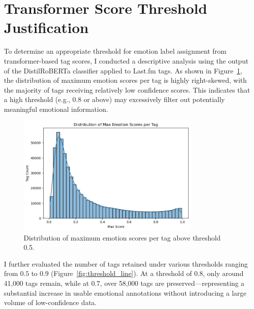 \documentclass{article}
\begin{document}
\newpage
\printbibliography
\newpage

\appendix

\section{Transformer Score Threshold Justification}
\label{appendix:threshold}

To determine an appropriate threshold for emotion label assignment from transformer-based tag scores, I conducted a descriptive analysis using the output of the DistilRoBERTa classifier applied to Last.fm tags. As shown in Figure~\ref{fig:maxscore_hist}, the distribution of maximum emotion scores per tag is highly right-skewed, with the majority of tags receiving relatively low confidence scores. This indicates that a high threshold (e.g., $0.8$ or above) may excessively filter out potentially meaningful emotional information.

\begin{figure}[H]
\centering
\includegraphics[width=0.8\textwidth]{Graphics/Appendix/Distribution of Max Emotion Scores Per Tag.png}
\caption{Distribution of maximum emotion scores per tag above threshold 0.5.}
\label{fig:maxscore_hist}
\end{figure}

\FloatBarrier

I further evaluated the number of tags retained under various thresholds ranging from $0.5$ to $0.9$ (Figure~\ref{fig:threshold_line}). At a threshold of $0.8$, only around 41,000 tags remain, while at $0.7$, over 58,000 tags are preserved—representing a substantial increase in usable emotional annotations without introducing a large volume of low-confidence data.
\end{document}
